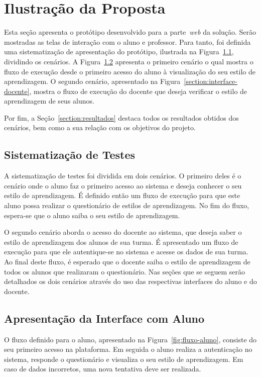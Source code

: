 \chapter{Ilustração da Proposta}

Esta seção apresenta o protótipo desenvolvido para a parte~\emph{web} da solução. Serão mostradas as telas de interação com o aluno e professor. Para tanto, foi definida uma sistematização de apresentação do protótipo, ilustrada na Figura~\ref{section:metodologia-testes}, dividindo os cenários.
A Figura~\ref{section:interface-aluno} apresenta o primeiro cenário o qual mostra o fluxo de execução desde o primeiro acesso do aluno à visualização do seu estilo de aprendizagem. O segundo cenário, apresentado na Figura~\ref{section:interface-docente}, mostra o fluxo de execução do docente que deseja verificar o estilo de aprendizagem de seus alunos.

Por fim, a Seção~\ref{section:resultados} destaca todos os resultados obtidos dos cenários, bem como a sua relação com os objetivos do projeto.

\section{Sistematização de Testes}\label{section:metodologia-testes}

A sistematização de testes foi dividida em dois cenários. O primeiro deles é o cenário onde o aluno faz o primeiro acesso ao sistema e deseja conhecer o seu estilo de aprendizagem. É definido então um fluxo de execução para que este aluno possa realizar o questionário de estilos de aprendizagem. No fim do fluxo, espera-se que o aluno saiba o seu estilo de aprendizagem.

O segundo cenário aborda o acesso do docente ao sistema, que deseja saber o estilo de aprendizagem dos alunos de sua turma. É apresentado um fluxo de execução para que ele autentique-se no sistema e acesse os dados de sua turma. Ao final deste fluxo, é esperado que o docente saiba o estilo de aprendizagem de todos os alunos que realizaram o questionário. Nas seções que se seguem serão detalhados os dois cenários através do uso das respectivas interfaces do aluno e do docente.

\section{Apresentação da Interface com Aluno}\label{section:interface-aluno}

O fluxo definido para o aluno, apresentado na Figura~\ref{fig:fluxo-aluno}, consiste do seu primeiro acesso na plataforma. Em seguida o aluno realiza a autenticação no sistema, responde o questionário e visualiza o seu estilo de aprendizagem. Em caso de dados incorretos, uma nova tentativa deve ser realizada.

